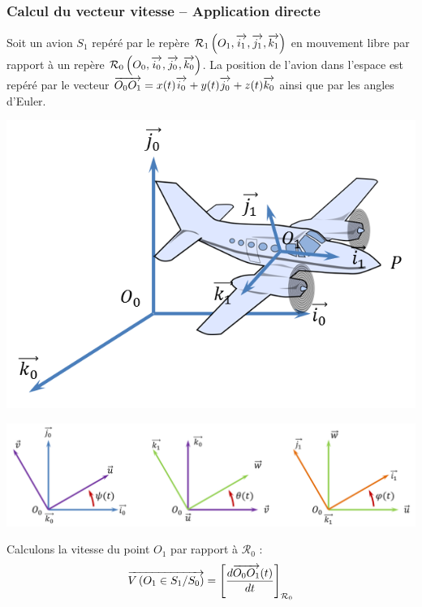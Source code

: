 \documentclass[10pt,oneside]{article}
\begin{document}
\subsubsection{Calcul du vecteur vitesse -- Application directe}

Soit un avion $S_1$ repéré par le repère $\mathcal{R}_1\left(O_1,\overrightarrow{i_1},\overrightarrow{j_1},\overrightarrow{k_1} \right)$ en mouvement libre par rapport à un repère $\mathcal{R}_0\left(O_0,\overrightarrow{i_0},\overrightarrow{j_0},\overrightarrow{k_0} \right)$.  La position de l'avion dans l'espace est repéré par le vecteur $\overrightarrow{O_0O_1}=x(t)\overrightarrow{i_0}+y(t)\overrightarrow{j_0}+z(t)\overrightarrow{k_0}$ ainsi que par les angles d'Euler.

\begin{minipage}[c]{.3\linewidth}
\begin{center}
\includegraphics[width=.95\textwidth]{png/cessna}
\end{center}
\end{minipage}\hfill
\begin{minipage}[c]{.65\linewidth}
\begin{center}
\includegraphics[width=.95\textwidth]{png/euler}
\end{center}
\end{minipage}


Calculons la vitesse du point $O_1$ par rapport à $\mathcal{R}_0$ :
$$
\overrightarrow{V\left( {O_1} \in {S_1}/{S_0}\right)} =  \left[\dfrac{d\overrightarrow{O_0 O_1}(t)}{dt}\right]_{\mathcal{R}_0} 
$$
\end{document}
